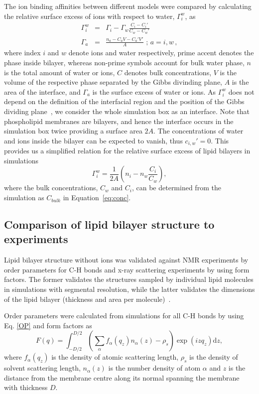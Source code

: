 \documentclass[aip,jcp,twocolumn]{revtex4}
\begin{document}
The ion binding affinities between different models were compared by calculating
the relative surface excess of ions with respect to water, $\Gamma_i^w$, as \cite{chattorajBOOK}
\begin{eqnarray}
  \Gamma_i^w   &=& \Gamma_i-\Gamma_w \frac{C_i-C_i'}{C_w-C_w'} \\
  \Gamma_{a} &=& \frac{n_{a} - C_{a} V - C_{a}' V'}{A} \, \, ; \, a=i,w \, ,
\end{eqnarray}
where index $i$ and $w$ denote ions and water respectively,
prime accent denotes the phase inside bilayer, 
whereas non-prime symbols account for bulk water phase,
$n$ is the total amount of water or ions,
$C$ denotes bulk concentrations, 
$V$ is the volume of the respective phase separated by the Gibbs divinding plane, 
$A$ is the area of the interface, 
and $\Gamma_a$ is the surface excess of water or ions. 
As $\Gamma_i^w$ does not depend on the definition of the interfacial region
and the position of the Gibbs dividing plane~\cite{chattorajBOOK},
we consider the whole simulation box as an interface. 
Note that phospholipid membranes are bilayers, 
and hence the interface occurs in the simulation box twice
providing a surface area $2A$.
The concentrations of water and ions inside
the bilayer can be expected to vanish, thus $c_{i,w}'=0$.
This provides us a simplified relation for 
the relative surface excess of lipid bilayers in simulations
\begin{equation}\label{surfexcess}
  \Gamma_i^w=\frac{1}{2A} \left ( n_i - n_w \frac{C_i}{C_w} \right ) ,
\end{equation}
where the bulk concentrations, $C_w$ and $C_i$, can be determined
from the simulation as $C_{bulk}$ in Equation~\ref{eq:conc}.

\subsection{Comparison of lipid bilayer structure to experiments}

Lipid bilayer structure without ions was validated against NMR experiments
by order parameters for C-H bonds and \mbox{x-ray} scattering experiments by using
form factors. The former validates the structures sampled by individual
lipid molecules in simulations with segmental resolution, while the latter
validates the dimensions of the lipid bilayer (thickness and area per
molecule)~\cite{ollila16}.

Order parameters were calculated from simulations for all C-H bonds
by using Eq. \ref{OP} and form factors as
\begin{equation}
  F(q) = \int _{-D/2} ^{D/2} \left ( \sum _\alpha f_\alpha (q_z) n_\alpha (z) - \rho _s \right ) \exp (izq_z) \mathrm{d}z,
\end{equation}
where $f_\alpha(q_z)$ is the density of atomic scattering length, 
$\rho_s$ is the density of solvent scattering length,
$n_\alpha (z)$ is the number density of atom $\alpha$ and
$z$ is the distance from the membrane centre along its normal 
spanning the membrane with thickness $D$. 
\end{document}
